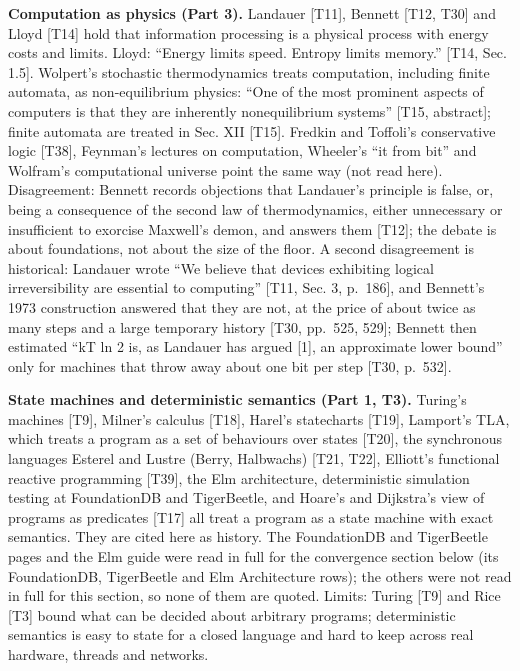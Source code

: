 \documentclass[10pt,letterpaper]{article}
\newcounter{none}
\begin{document}
\textbf{Computation as physics (Part 3).} Landauer {[}T11{]}, Bennett
{[}T12, T30{]} and Lloyd {[}T14{]} hold that information processing is a
physical process with energy costs and limits. Lloyd: ``Energy limits
speed. Entropy limits memory.'' {[}T14, Sec. 1.5{]}. Wolpert's
stochastic thermodynamics treats computation, including finite automata,
as non-equilibrium physics: ``One of the most prominent aspects of
computers is that they are inherently nonequilibrium systems'' {[}T15,
abstract{]}; finite automata are treated in Sec. XII {[}T15{]}. Fredkin
and Toffoli's conservative logic {[}T38{]}, Feynman's lectures on
computation, Wheeler's ``it from bit'' and Wolfram's computational
universe point the same way (not read here). Disagreement: Bennett
records objections that Landauer's principle is false, or, being a
consequence of the second law of thermodynamics, either unnecessary or
insufficient to exorcise Maxwell's demon, and answers them {[}T12{]};
the debate is about foundations, not about the size of the floor. A
second disagreement is historical: Landauer wrote ``We believe that
devices exhibiting logical irreversibility are essential to computing''
{[}T11, Sec. 3, p.~186{]}, and Bennett's 1973 construction answered that
they are not, at the price of about twice as many steps and a large
temporary history {[}T30, pp.~525, 529{]}; Bennett then estimated ``kT
ln 2 is, as Landauer has argued {[}1{]}, an approximate lower bound''
only for machines that throw away about one bit per step {[}T30,
p.~532{]}.

\textbf{State machines and deterministic semantics (Part 1, T3).}
Turing's machines {[}T9{]}, Milner's calculus {[}T18{]}, Harel's
statecharts {[}T19{]}, Lamport's TLA, which treats a program as a set of
behaviours over states {[}T20{]}, the synchronous languages Esterel and
Lustre (Berry, Halbwachs) {[}T21, T22{]}, Elliott's functional reactive
programming {[}T39{]}, the Elm architecture, deterministic simulation
testing at FoundationDB and TigerBeetle, and Hoare's and Dijkstra's view
of programs as predicates {[}T17{]} all treat a program as a state
machine with exact semantics. They are cited here as history. The
FoundationDB and TigerBeetle pages and the Elm guide were read in full
for the convergence section below (its FoundationDB, TigerBeetle and Elm
Architecture rows); the others were not read in full for this section,
so none of them are quoted. Limits: Turing {[}T9{]} and Rice {[}T3{]}
bound what can be decided about arbitrary programs; deterministic
semantics is easy to state for a closed language and hard to keep across
real hardware, threads and networks.
\end{document}
